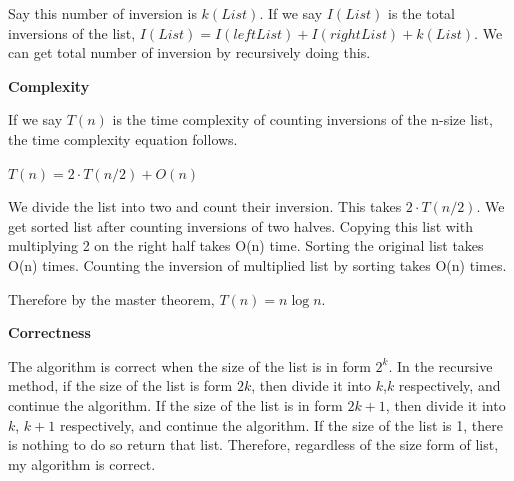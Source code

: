 \documentclass[a4paper,11pt]{article}
\begin{document}
\begin{enumerate}
Say this number of inversion is $k(List)$.
If we say $I(List)$ is the total inversions of the list, $I(List) = I(leftList) + I(rightList) + k(List)$.
We can get total number of inversion by recursively doing this.

{\bf Complexity}

If we say $T(n)$ is the time complexity of counting inversions of the n-size list, the time complexity equation follows.

$T(n) = 2 \cdot T(n/2) + O(n)$

We divide the list into two and count their inversion. This takes $2\cdot T(n/2)$.
We get sorted list after counting inversions of two halves.
Copying this list with multiplying 2 on the right half takes O(n) time.
Sorting the original list takes O(n) times.
Counting the inversion of multiplied list by sorting takes O(n) times.

Therefore by the master theorem, $T(n) = n \log n$.

{\bf Correctness}

The algorithm is correct when the size of the list is in form $2^k$.
In the recursive method, if the size of the list is form $2k$, then divide it into $k$,$k$ respectively, and continue the algorithm.
If the size of the list is in form $2k+1$, then divide it into $k$, $k+1$ respectively, and continue the algorithm.
If the size of the list is 1,  there is nothing to do so return that list.
Therefore, regardless of the size form of list, my algorithm is correct.


\end{enumerate}
\end{document}
